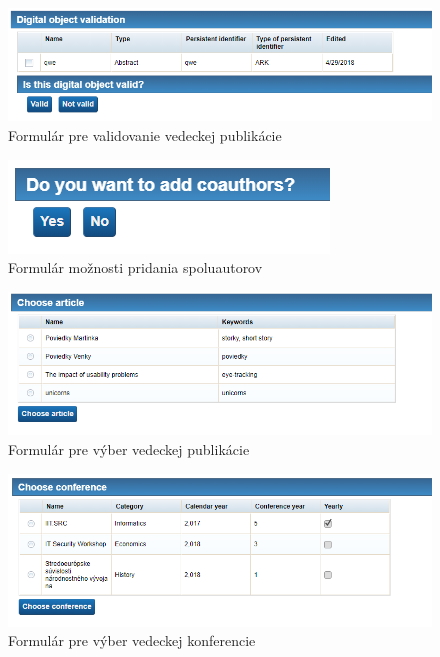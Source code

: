 \documentclass[10pt,oneside,slovak,a4paper]{article}
\begin{document}
\begin{figure} [H]
\centering
\includegraphics[scale=0.4]{forms/Coach for validating publication.png} 
\caption{Formulár pre validovanie vedeckej publikácie}
\end{figure}

\begin{figure} [H]
\centering
\includegraphics[scale=0.4]{forms/Coach choice to add couthors.png} 
\caption{Formulár možnosti pridania spoluautorov}
\end{figure}

\begin{figure} [H]
\centering
\includegraphics[scale=0.4]{forms/Coach Choose article.png} 
\caption{Formulár pre výber vedeckej publikácie}
\end{figure}

\begin{figure} [H]
\centering
\includegraphics[scale=0.4]{forms/Coach choose conference.png} 
\caption{Formulár pre výber vedeckej konferencie}
\end{figure}
\end{document}
